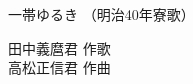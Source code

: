 \documentclass[10pt,b5j]{tarticle} %
\begin{document}
\begin{minipage}[c]{0.7\hsize} %
    \begin{center}
        {\LARGE
            一帯ゆるき %
        }
        {\small 
            （明治40年寮歌） %
        }
    \end{center}
\end{minipage}
\begin{minipage}[c]{0.3\hsize} %
    \begin{flushright} %
        田中義麿君 作歌\\高松正信君 作曲 %
    \end{flushright}
\end{minipage}
\end{document}
